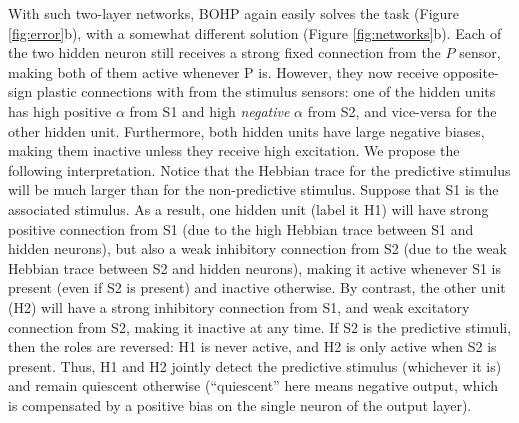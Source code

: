 \documentclass{article}
\begin{document}
With such two-layer networks, BOHP again easily solves the task (Figure
\ref{fig:error}b), with a somewhat different solution (Figure
\ref{fig:networks}b). Each of the two hidden neuron still receives a strong
fixed connection from the $P$ sensor, making both of them active whenever P is.
However, they now receive opposite-sign plastic connections with from the
stimulus sensors: one of the hidden units has high positive $\alpha$ from S1
and high \emph{negative} $\alpha$ from S2, and vice-versa for the other hidden
unit.  Furthermore, both hidden units have large negative biases, making them
inactive unless they receive high excitation.  We propose the following
interpretation. Notice that the Hebbian trace for the predictive stimulus will
be much larger than for the non-predictive stimulus.  Suppose that S1 is the
associated stimulus. As a result, one hidden unit (label it H1) will have
strong positive connection from S1 (due to the high Hebbian trace between S1
and hidden neurons), but also a weak inhibitory connection from S2 (due to the
weak Hebbian trace between S2 and hidden neurons), making it active whenever S1
is present (even if S2 is present) and inactive otherwise. By contrast, the
other unit (H2) will have a strong inhibitory connection from S1, and weak
excitatory connection from S2, making it inactive at any time. If S2 is the
predictive stimuli, then the roles are reversed: H1 is never active, and H2 is
only active when S2 is present. Thus, H1 and H2 jointly detect the predictive
stimulus (whichever it is) and remain quiescent otherwise (``quiescent'' here
means negative output, which is compensated by a positive bias on the single
neuron of the output layer).

\end{document}
